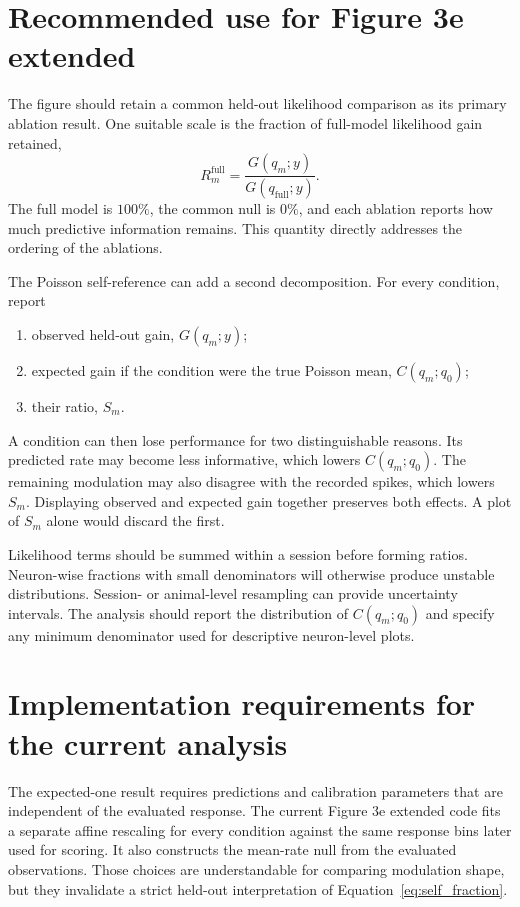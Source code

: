 \documentclass[11pt]{article}
\begin{document}
\section{Recommended use for Figure 3e extended}

The figure should retain a common held-out likelihood comparison as its primary ablation result. One suitable scale is the fraction of full-model likelihood gain retained,
\begin{equation}
R_m^{\mathrm{full}}
=
\frac{G(q_m;y)}{G(q_{\mathrm{full}};y)}.
\label{eq:retained}
\end{equation}
The full model is $100\%$, the common null is $0\%$, and each ablation reports how much predictive information remains. This quantity directly addresses the ordering of the ablations.

The Poisson self-reference can add a second decomposition. For every condition, report
\begin{enumerate}
    \item observed held-out gain, $G(q_m;y)$;
    \item expected gain if the condition were the true Poisson mean, $C(q_m;q_0)$;
    \item their ratio, $S_m$.
\end{enumerate}
A condition can then lose performance for two distinguishable reasons. Its predicted rate may become less informative, which lowers $C(q_m;q_0)$. The remaining modulation may also disagree with the recorded spikes, which lowers $S_m$. Displaying observed and expected gain together preserves both effects. A plot of $S_m$ alone would discard the first.

Likelihood terms should be summed within a session before forming ratios. Neuron-wise fractions with small denominators will otherwise produce unstable distributions. Session- or animal-level resampling can provide uncertainty intervals. The analysis should report the distribution of $C(q_m;q_0)$ and specify any minimum denominator used for descriptive neuron-level plots.

\section{Implementation requirements for the current analysis}

The expected-one result requires predictions and calibration parameters that are independent of the evaluated response. The current Figure 3e extended code fits a separate affine rescaling for every condition against the same response bins later used for scoring. It also constructs the mean-rate null from the evaluated observations. Those choices are understandable for comparing modulation shape, but they invalidate a strict held-out interpretation of Equation~\ref{eq:self_fraction}.
\end{document}
